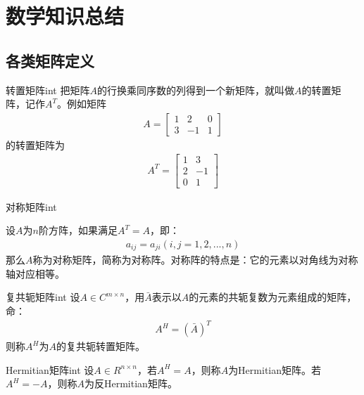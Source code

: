 \chapter{数学知识总结}

\section{各类矩阵定义}

\begin{definition}{\hypertarget{transpose}{转置矩阵}}{int}
\label{def:transpose}
把矩阵$A$的行换乘同序数的列得到一个新矩阵，就叫做$A$的转置矩阵，记作$A^{T}$。例如矩阵
\begin{align}
A = 
\begin{bmatrix}
1 & 2 & 0 \\
3 & -1 & 1
\end{bmatrix}
\end{align}
的转置矩阵为
\begin{align}
A^{T} = 
\begin{bmatrix}
1 & 3 \\
2 & -1 \\
0 & 1
\end{bmatrix}
\end{align}
\end{definition}

\begin{definition}{\hypertarget{symmetric}{对称矩阵}}{int}
\label{def:symmetric}

设$A$为$n$阶方阵，如果满足$A^T=A$，即：
\begin{align}
a_{ij} = a_{ji}  (i,j=1, 2, ..., n)
\end{align}
那么$A$称为对称矩阵，简称为对称阵。对称阵的特点是：它的元素以对角线为对称轴对应相等。
\end{definition}

\begin{definition}{\hypertarget{ctranspose}{复共轭矩阵}}{int}
\label{def:ctranspose}
设$A\in{C^{m\times{n}}}$，用$\bar{A}$表示以$A$的元素的共轭复数为元素组成的矩阵，命：
\begin{align}
A^{H} = (\bar{A})^{T}
\end{align}
则称$A^{H}$为$A$的复共轭转置矩阵。
\end{definition}



\begin{definition}{\hypertarget{hermitian}{Hermitian矩阵}}{int}
\label{def:hermitian}
设$A\in{R^{n\times{n}}}$，若$A^{H}=A$，则称$A$为Hermitian矩阵。若$A^{H}=-A$，则称$A$为反Hermitian矩阵。
\end{definition}

